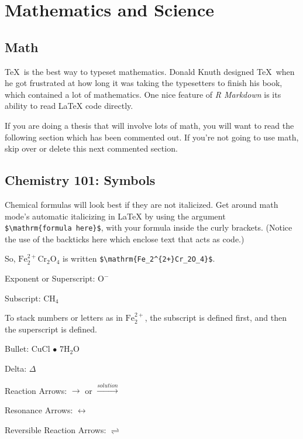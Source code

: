 \documentclass[12pt,twoside]{reedthesis}
\begin{document}
\chapter{Mathematics and Science}\label{math-sci}

\section{Math}\label{math}

\TeX~is the best way to typeset mathematics. Donald Knuth designed \TeX~when he got frustrated at how long it was taking the typesetters to finish his book, which contained a lot of mathematics. One nice feature of \emph{R Markdown} is its ability to read LaTeX code directly.

If you are doing a thesis that will involve lots of math, you will want to read the following section which has been commented out. If you're not going to use math, skip over or delete this next commented section.

\section{Chemistry 101: Symbols}\label{chemistry-101-symbols}

Chemical formulas will look best if they are not italicized. Get around math mode's automatic italicizing in LaTeX by using the argument \texttt{\$\textbackslash{}mathrm\{formula\ here\}\$}, with your formula inside the curly brackets. (Notice the use of the backticks here which enclose text that acts as code.)

So, \(\mathrm{Fe_2^{2+}Cr_2O_4}\) is written \texttt{\$\textbackslash{}mathrm\{Fe\_2\^{}\{2+\}Cr\_2O\_4\}\$}.

\noindent Exponent or Superscript: \(\mathrm{O^-}\)

\noindent Subscript: \(\mathrm{CH_4}\)

To stack numbers or letters as in \(\mathrm{Fe_2^{2+}}\), the subscript is defined first, and then the superscript is defined.

\noindent Bullet: CuCl \(\bullet\) \(\mathrm{7H_{2}O}\)

\noindent Delta: \(\Delta\)

\noindent Reaction Arrows: \(\longrightarrow\) or \(\xrightarrow{solution}\)

\noindent Resonance Arrows: \(\leftrightarrow\)

\noindent Reversible Reaction Arrows: \(\rightleftharpoons\)
\end{document}
